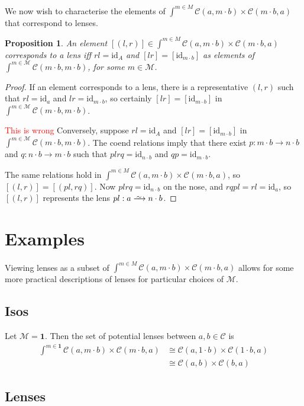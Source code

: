 \documentclass[11pt,a4paper]{amsart}
\theoremstyle{plain}
\newtheorem{proposition}[theorem]{Proposition}
\theoremstyle{definition}
\newcommand{\id}{\mathrm{id}}
\newcommand{\C}{\mathscr{C}}
\newcommand{\M}{\mathscr{M}}
\newcommand{\todo}[1]{\textcolor{red}{\small #1}}
\newcommand{\isoto}{\xrightarrow{
   \,\smash{\raisebox{-0.65ex}{\ensuremath{\scriptstyle\sim}}}\,}}
\begin{document}
We now wish to characterise the elements of $\int^{m \in M} \C(a, m\cdot b) \times \C(m\cdot b, a)$ that correspond to lenses.

\begin{proposition}\label{characterise-lenses-in-coend}
An element $[(l, r)] \in \int^{m \in M} \C(a, m\cdot b) \times \C(m\cdot b, a)$ corresponds to a lens iff $rl = \id_A$ and $[lr] = [\id_{m\cdot b}]$ as elements of $\int^{m\in \M} \C(m \cdot b, m \cdot b)$, for some $m \in \M$.
\end{proposition}
\begin{proof}
If an element corresponds to a lens, there is a representative $(l, r)$ such that $rl = \id_a$ and $lr = \id_{m\cdot b}$, so certainly $[lr] = [\id_{m\cdot b}]$ in $\int^{m\in \M} \C(m \cdot b, m \cdot b)$.

\todo{This is wrong} Conversely, suppose $rl = \id_A$ and $[lr] = [\id_{m\cdot b}]$ in $\int^{m\in \M} \C(m \cdot b, m \cdot b)$. The coend relations imply that there exist $p : m \cdot b \to n \cdot b$ and $q : n \cdot b \to m \cdot b$ such that $plrq = \id_{n\cdot b}$ and $qp = \id_{m\cdot b}$. 

The same relations hold in $\int^{m \in M} \C(a, m\cdot b) \times \C(m\cdot b, a)$, so $[(l, r)] = [(pl, rq)]$. Now $plrq = \id_{n\cdot b}$ on the nose, and $rqpl = rl = \id_a$, so $[(l, r)]$ represents the lens $pl : a \isoto n \cdot b$.
\end{proof}

\section{Examples}

Viewing lenses as a subset of $\int^{m \in M} \C(a, m\cdot b) \times \C(m\cdot b, a)$ allows for some more practical descriptions of lenses for particular choices of $\M$.

\subsection{Isos}

Let $\M = \mathbf{1}$. Then the set of potential lenses between $a, b \in \C$ is 
\begin{align*}
\int^{m \in \mathbf{1}} \C(a, m \cdot b) \times \C(m \cdot b, a)
&\cong \C(a, 1 \cdot b) \times \C(1 \cdot b, a) \\
&\cong \C(a, b) \times \C(b, a)
\end{align*}

\subsection{Lenses}
\end{document}
